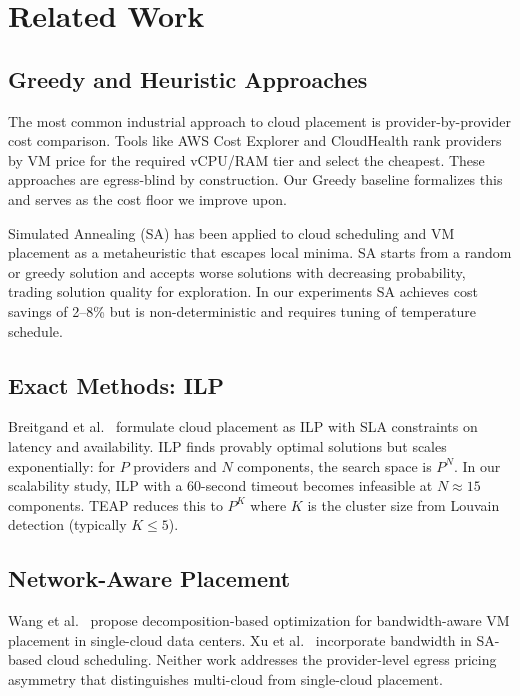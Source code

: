 \documentclass[10pt,journal,compsoc]{IEEEtran}
\begin{document}
\section{Related Work}
\label{sec:related}

\subsection{Greedy and Heuristic Approaches}
The most common industrial approach to cloud placement is provider-by-provider
cost comparison.
Tools like AWS Cost Explorer and CloudHealth \cite{cloudhealth} rank providers
by VM price for the required vCPU/RAM tier and select the cheapest.
These approaches are egress-blind by construction.
Our Greedy baseline formalizes this and serves as the cost floor we improve
upon.

Simulated Annealing (SA) \cite{kirkpatrick1983} has been applied to cloud
scheduling \cite{xu2010} and VM placement \cite{beloglazov2012} as a
metaheuristic that escapes local minima.
SA starts from a random or greedy solution and accepts worse solutions with
decreasing probability, trading solution quality for exploration.
In our experiments SA achieves cost savings of 2–8\% but is non-deterministic
and requires tuning of temperature schedule.

\subsection{Exact Methods: ILP}
Breitgand et al.~\cite{breitgand2012} formulate cloud placement as ILP with
SLA constraints on latency and availability.
ILP finds provably optimal solutions but scales exponentially: for $P$
providers and $N$ components, the search space is $P^N$.
In our scalability study, ILP with a 60-second timeout becomes infeasible at
$N \approx 15$ components.
TEAP reduces this to $P^K$ where $K$ is the cluster size from Louvain
detection (typically $K \leq 5$).

\subsection{Network-Aware Placement}
Wang et al.~\cite{wang2011} propose decomposition-based optimization for
bandwidth-aware VM placement in single-cloud data centers.
Xu et al.~\cite{xu2010} incorporate bandwidth in SA-based cloud scheduling.
Neither work addresses the provider-level egress pricing asymmetry that
distinguishes multi-cloud from single-cloud placement.
\end{document}
